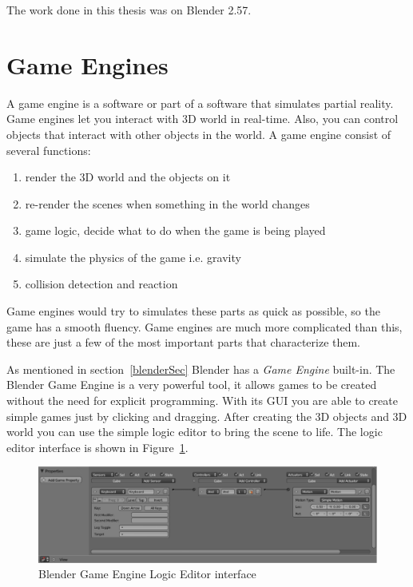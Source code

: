 The work done in this thesis was on Blender 2.57.

\section{Game Engines}

A game engine is a software or part of a software that simulates partial reality\cite{bookGameKit2}. Game engines let you interact with 3D world in real-time. Also, you can control objects that interact with other objects in the world. A game engine consist of several functions:
\begin{enumerate}
\item{render the 3D world and the objects on it}
\item{re-render the scenes when something in the world changes}
\item{game logic, decide what to do when the game is being played}
\item{simulate the physics of the game i.e. gravity}
\item{collision detection and reaction}
\end{enumerate}

Game engines would try to simulates these parts as quick as possible, so the game has a smooth fluency. Game engines are much more complicated than this, these are just a few of the most important parts that characterize them.

As mentioned in section~\ref{blenderSec} Blender has a \textit{Game Engine} built-in. The Blender Game Engine is a very powerful tool, it allows games to be created without  the need for explicit programming. With its GUI you are able to create simple games just by clicking and dragging. After creating the 3D objects and 3D world you can use the simple logic editor to bring the scene to life. The logic editor interface is shown in Figure~\ref{logic}.

\begin{figure}[htbp]
\begin{center}
\includegraphics[scale=0.4]{figures/logic.pdf}
\caption{Blender Game Engine Logic Editor interface}
\label{logic}
\end{center}
\end{figure}

